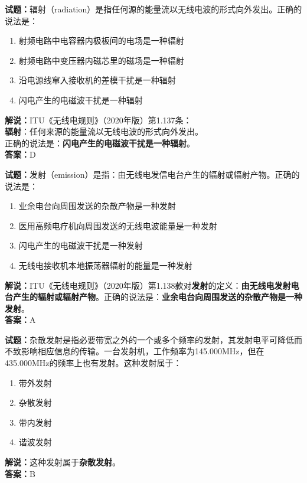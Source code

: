 \documentclass{ctexbook}
\begin{document}
\bigskip




\noindent\textbf{试题：}辐射（radiation）是指任何源的能量流以无线电波的形式向外发出。正确的说法是：
\begin{enumerate}[leftmargin=3em]
\item 射频电路中电容器内极板间的电场是一种辐射
\item 射频电路中变压器内磁芯里的磁场是一种辐射
\item 沿电源线窜入接收机的差模干扰是一种辐射
\item 闪电产生的电磁波干扰是一种辐射
\end{enumerate}
\textbf{解说：}ITU《无线电规则》（2020年版）第1.137条：\\\textbf{辐射}：任何来源的能量流以无线电波的形式向外发出。\\正确的说法是：\textbf{闪电产生的电磁波干扰是一种辐射}。\\\noindent\textbf{答案：}D

\bigskip




\noindent\textbf{试题：}发射（emission）是指：由无线电发信电台产生的辐射或辐射产物。正确的说法是：
\begin{enumerate}[leftmargin=3em]
\item 业余电台向周围发送的杂散产物是一种发射
\item 医用高频电疗机向周围发送的无线电波能量是一种发射
\item 闪电产生的电磁波干扰是一种发射
\item 无线电接收机本地振荡器辐射的能量是一种发射
\end{enumerate}
\noindent\textbf{解说：}ITU《无线电规则》（2020年版）第1.138款对\textbf{发射}的定义：\textbf{由无线电发射电台产生的辐射或辐射产物}。正确的说法是：\textbf{业余电台向周围发送的杂散产物是一种发射}。\\\noindent\textbf{答案：}A

\bigskip




\noindent\textbf{试题：}杂散发射是指必要带宽之外的一个或多个频率的发射，其发射电平可降低而不致影响相应信息的传输。一台发射机，工作频率为145.000\unit{\MHz}，但在435.000\unit{\MHz}的频率上也有发射。这种发射属于：
\begin{enumerate}[leftmargin=3em]
\item 带外发射
\item 杂散发射
\item 带内发射
\item 谐波发射
\end{enumerate}
\noindent\textbf{解说：}这种发射属于\textbf{杂散发射}。\\\noindent\textbf{答案：}B
\end{document}
